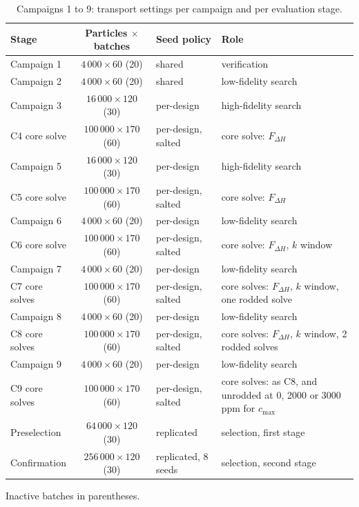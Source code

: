 \begin{table}[htbp]
  \centering
  \begin{threeparttable}
  \caption{Campaigns 1 to 9: transport settings per campaign and per evaluation stage.}
  \label{tab:fidelity}
  \footnotesize
  \begin{tabularx}{\textwidth}{@{}>{\raggedright\arraybackslash}p{}c>{\raggedright\arraybackslash}p{}>{\raggedright\arraybackslash}X@{}}
    \toprule
    Stage & Particles $\times$ batches\tnote{a} & Seed policy & Role \\
    \midrule
    Campaign 1     & $4\,000\times60$ (20)    & shared              & verification \\
    Campaign 2     & $4\,000\times60$ (20)    & shared              & low-fidelity search \\
    Campaign 3     & $16\,000\times120$ (30)  & per-design          & high-fidelity search \\
    C4 core solve  & $100\,000\times170$ (60) & per-design, salted  & core solve: $F_{\Delta H}$ \\
    Campaign 5     & $16\,000\times120$ (30)  & per-design          & high-fidelity search \\
    C5 core solve  & $100\,000\times170$ (60) & per-design, salted  & core solve: $F_{\Delta H}$ \\
    Campaign 6     & $4\,000\times60$ (20)    & per-design          & low-fidelity search \\
    C6 core solve  & $100\,000\times170$ (60) & per-design, salted  & core solve: $F_{\Delta H}$, $k$ window \\
    Campaign 7     & $4\,000\times60$ (20)    & per-design          & low-fidelity search \\
    C7 core solves & $100\,000\times170$ (60) & per-design, salted  & core solves: $F_{\Delta H}$, $k$ window, one rodded solve \\
    Campaign 8     & $4\,000\times60$ (20)    & per-design          & low-fidelity search \\
    C8 core solves & $100\,000\times170$ (60) & per-design, salted  & core solves: $F_{\Delta H}$, $k$ window, 2 rodded solves \\
    Campaign 9     & $4\,000\times60$ (20)    & per-design          & low-fidelity search \\
    C9 core solves & $100\,000\times170$ (60) & per-design, salted  & core solves: as C8, and unrodded at 0, 2000 or 3000\,ppm for $c_\mathrm{max}$ \\
    Preselection   & $64\,000\times120$ (30)  & replicated          & selection, first stage \\
    Confirmation   & $256\,000\times120$ (30) & replicated, 8 seeds & selection, second stage \\
    \bottomrule
  \end{tabularx}
  \begin{tablenotes}[flushleft]\footnotesize
    \item[a] Inactive batches in parentheses.
  \end{tablenotes}
  \end{threeparttable}
\end{table}

